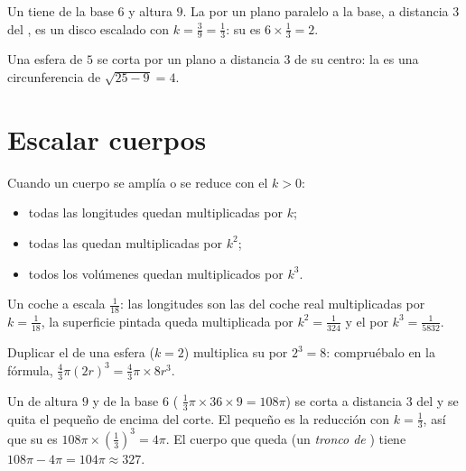 \begin{example}\label{ex:g9:solids:section}
Un  tiene  de la base $6$ y altura $9$. La  por un plano
paralelo a la base, a distancia $3$ del , es un disco escalado con
$k = \frac39 = \frac13$: su  es $6 \times \frac13 = 2$.

Una esfera de  $5$ se corta por un plano a distancia $3$ de su
centro: la  es una circunferencia de  $\sqrt{25 - 9} = 4$.
\end{example}

\section{Escalar cuerpos}

\begin{theorem}\label{thm:g9:solids:scaling}
Cuando un cuerpo se amplía o se reduce con el  $k > 0$:
\begin{itemize}
  \item todas las longitudes quedan multiplicadas por $k$;
  \item todas las  quedan multiplicadas por $k^2$;
  \item todos los volúmenes quedan multiplicados por $k^3$.
\end{itemize}
\end{theorem}
\admitted

\begin{example}\label{ex:g9:solids:scaling}
Un coche a escala $\frac{1}{18}$: las longitudes son las del coche real
multiplicadas por $k = \frac{1}{18}$, la superficie pintada queda multiplicada por
$k^2 = \frac{1}{324}$ y el  por $k^3 = \frac{1}{5832}$.

Duplicar el  de una esfera ($k = 2$) multiplica su  por
$2^3 = 8$: compruébalo en la fórmula,
$\frac43\pi (2r)^3 = \frac43 \pi \times 8r^3$.
\end{example}

\begin{example}\label{ex:g9:solids:truncated}
Un  de altura $9$ y  de la base $6$ (
$\frac13 \pi \times 36 \times 9 = 108\pi$) se corta a distancia $3$ del
 y se quita el  pequeño de encima del corte. El  pequeño es
la reducción con $k = \frac13$, así que su  es
$108\pi \times \left(\frac13\right)^3 = 4\pi$. El cuerpo que queda (un
\emph{tronco de }) tiene  $108\pi - 4\pi = 104\pi \approx 327$.
\end{example}

